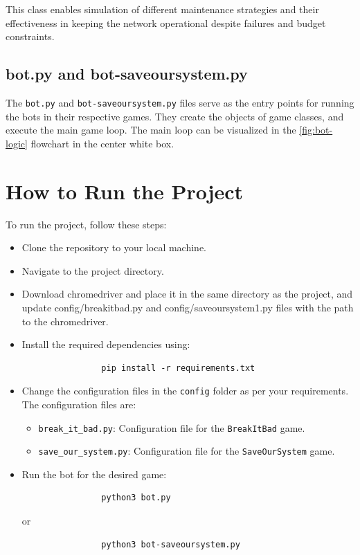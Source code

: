 \documentclass[12pt,a4paper]{article}
\begin{document}
        This class enables simulation of different maintenance strategies and their effectiveness in keeping the network operational despite failures and budget constraints.
    
    \subsection*{bot.py and bot-saveoursystem.py}
    \label{subsec:bot-files}

        The \texttt{bot.py} and \texttt{bot-saveoursystem.py} files serve as the entry points for running the bots in their respective games. They create the objects of game classes, and execute the main game loop. The main loop can be visualized in the \cref{fig:bot-logic} flowchart in the center white box.
    
    \section{How to Run the Project}
    \label{sec:how-to-run}
    To run the project, follow these steps:
    \begin{itemize}
        \item Clone the repository to your local machine.
        \item Navigate to the project directory.
        \item Download chromedriver and place it in the same directory as the project, and update config/breakitbad.py and config/saveoursystem1.py files with the path to the chromedriver.
        \item Install the required dependencies using:
            \begin{verbatim}
                pip install -r requirements.txt
            \end{verbatim}
        \item Change the configuration files in the \texttt{config} folder as per your requirements. The configuration files are:
            \begin{itemize}
                \item \texttt{break\_it\_bad.py}: Configuration file for the \texttt{BreakItBad} game.
                \item \texttt{save\_our\_system.py}: Configuration file for the \texttt{SaveOurSystem} game.
            \end{itemize}
        \item Run the bot for the desired game:
            \begin{verbatim}
                python3 bot.py
            \end{verbatim}
            or
            \begin{verbatim}
                python3 bot-saveoursystem.py
            \end{verbatim}
    \end{itemize}
        
\end{document}
